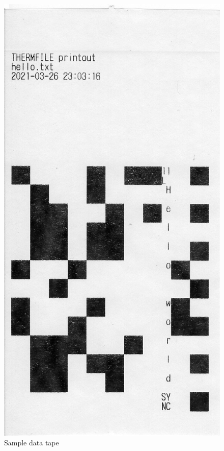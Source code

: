 \documentclass{article}
\begin{document}
	\begin{landscape}
		\begin{figure}[h]
				\includegraphics[width=\linewidth]{img/helloworld}
				\caption{Sample data tape}
			\endminipage\hfill

\end{figure}
\end{landscape}
\end{document}
